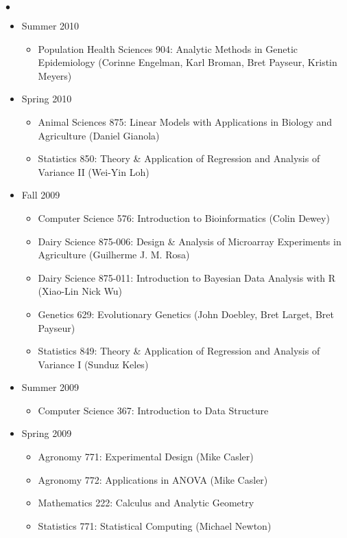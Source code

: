 \documentclass[margin,line,10pt]{res}
\newenvironment{list2}{
  \begin{list}{$\bullet$}{%
      \setlength{\itemsep}{0in}
      \setlength{\parsep}{0in} \setlength{\parskip}{0in}
      \setlength{\topsep}{0in} \setlength{\partopsep}{0in} 
      \setlength{\leftmargin}{0.2in}}}{\end{list}}
\begin{document}
\begin{resume}
\begin{list2}
\begin{itemize}
\item Summer 2010
\begin{itemize}
\item    Population Health Sciences 904: Analytic Methods in Genetic Epidemiology (Corinne Engelman, Karl Broman, Bret Payseur, Kristin Meyers)
\end{itemize}


\item Spring 2010
\begin{itemize}

\item    Animal Sciences 875: Linear Models with Applications in Biology and Agriculture (Daniel Gianola)
\item    Statistics 850: Theory \& Application of Regression and Analysis of Variance II (Wei-Yin Loh)

\end{itemize}


\item Fall 2009
\begin{itemize}
\item    Computer Science 576: Introduction to Bioinformatics (Colin Dewey)
\item    Dairy Science 875-006: Design \& Analysis of Microarray Experiments in Agriculture (Guilherme J. M. Rosa)
\item    Dairy Science 875-011: Introduction to Bayesian Data Analysis with R (Xiao-Lin Nick Wu)
\item    Genetics 629: Evolutionary Genetics (John Doebley, Bret Larget, Bret Payseur)
\item    Statistics 849: Theory \& Application of Regression and Analysis of Variance I (Sunduz Keles)
\end{itemize}




\item Summer 2009
\begin{itemize}
\item Computer Science 367: Introduction to Data Structure
\end{itemize}

\item Spring 2009
\begin{itemize}
\item Agronomy 771: Experimental Design (Mike Casler)
\item Agronomy 772: Applications in ANOVA (Mike Casler)
\item Mathematics 222: Calculus and Analytic Geometry
\item Statistics 771: Statistical Computing (Michael Newton)
\end{itemize}



\end{itemize}
\end{list2}
\end{resume}
\end{document}
